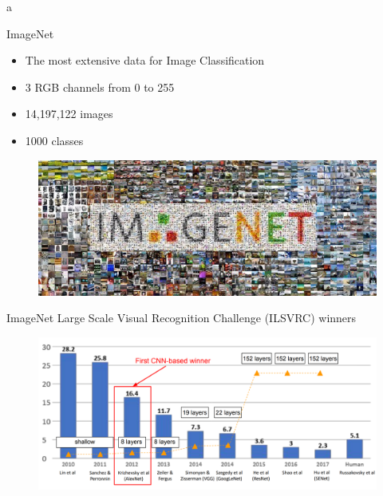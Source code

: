 a\documentclass[10pt]{beamer}
\theoremstyle{remark}
\theoremstyle{definition}
\begin{document}
\begin{frame}{ImageNet}
\begin{itemize}
    \item The most extensive data for Image Classification
    \item 3 RGB channels from 0 to 255
    \item 14,197,122 images
    \item 1000 classes
\end{itemize}

\begin{figure}
\centering
\includegraphics[width=1.0\textwidth,height=0.5\textheight,keepaspectratio]{./images/imagenet.png}
\end{figure}
\end{frame}

\begin{frame}{ImageNet Large Scale Visual Recognition Challenge (ILSVRC) winners}
\begin{figure}
\centering
\includegraphics[width=1.0\textwidth,height=1.0\textheight,keepaspectratio]{./images/imagenet_2.png}
\end{figure}

    
\end{frame}
\end{document}
